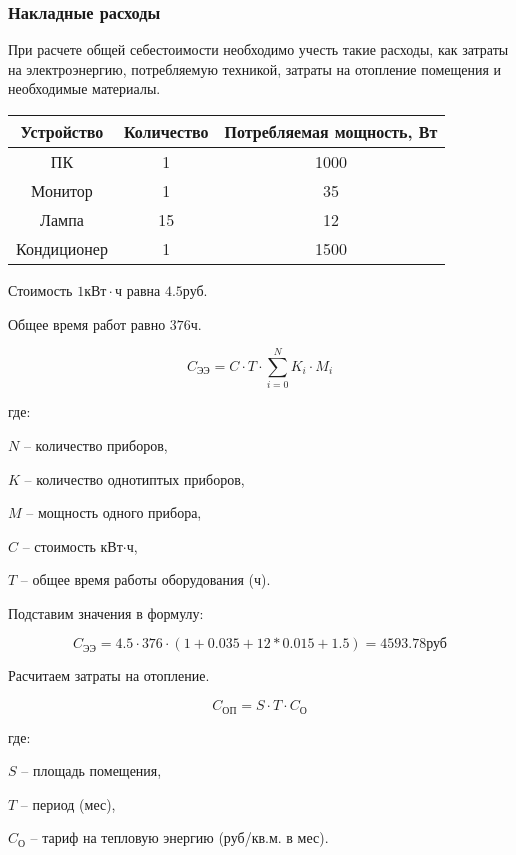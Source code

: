 \subsubsection{Накладные расходы}

При расчете общей себестоимости необходимо учесть такие расходы,
как затраты на электроэнергию, потребляемую техникой, затраты на
отопление помещения и необходимые материалы.

\vspace{1em}

\begin{tabular}{|c|c|c|}
\hline
Устройство & Количество & Потребляемая мощность, Вт \\
\hline
ПК & 1 & 1000 \\
\hline
Монитор & 1 & 35 \\
\hline
Лампа & 15 & 12 \\
\hline
Кондиционер & 1 & 1500 \\
\hline
\end{tabular}

\vspace{1em}

Стоимость $1\text{кВт} \cdot \text{ч}$ равна $4.5\text{руб}$.

Общее время работ равно $376\text{ч}$.

$$ C_\text{ЭЭ} = C \cdot T \cdot \sum_{i=0}^N K_i \cdot M_i $$

где:

$N$ -- количество приборов,

$K$ -- количество однотиптых приборов,

$M$ -- мощность одного прибора,

$C$ -- стоимость кВт$\cdot$ч,

$T$ -- общее время работы оборудования (ч).

Подставим значения в формулу:

$$ C_\text{ЭЭ} = 4.5 \cdot 376 \cdot (1 + 0.035 + 12 * 0.015 + 1.5) = 4593.78 \text{руб} $$

\vspace{1em}

Расчитаем затраты на отопление.

$$ C_\text{ОП} = S \cdot T \cdot C_\text{О} $$

где: 

$S$ -- площадь помещения,

$T$ -- период (мес),

$C_\text{О}$ -- тариф на тепловую энергию (руб/кв.м. в мес).

